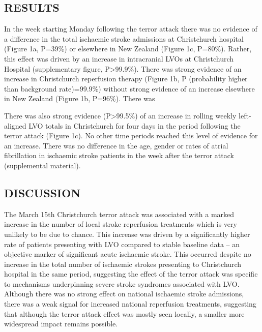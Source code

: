 \documentclass[
]{article}
\begin{document}
\hypertarget{results}{%
\subsection{RESULTS}\label{results}}

In the week starting Monday following the terror attack there was no
evidence of a difference in the total ischaemic stroke admissions at
Christchurch hospital (Figure 1a, P=39\%) or elsewhere in New Zealand
(Figure 1c, P=80\%). Rather, this effect was driven by an increase in
intracranial LVOs at Christchurch Hospital (supplementary figure,
P\textgreater99.9\%). There was strong evidence of an increase in
Christchurch reperfusion therapy (Figure 1b, P (probability higher than
background rate)=99.9\%) without strong evidence of an increase
elsewhere in New Zealand (Figure 1b, P=96\%). There was

There was also strong evidence (P\textgreater99.5\%) of an increase in
rolling weekly left-aligned LVO totals in Christchurch for four days in
the period following the terror attack (Figure 1c). No other time
periods reached this level of evidence for an increase. There was no
difference in the age, gender or rates of atrial fibrillation in
ischaemic stroke patients in the week after the terror attack
(supplemental material).

\hypertarget{discussion}{%
\subsection{DISCUSSION}\label{discussion}}

The March 15th Christchurch terror attack was associated with a marked
increase in the number of local stroke reperfusion treatments which is
very unlikely to be due to chance. This increase was driven by a
significantly higher rate of patients presenting with LVO compared to
stable baseline data -- an objective marker of significant acute
ischaemic stroke. This occurred despite no increase in the total number
of ischaemic strokes presenting to Christchurch hospital in the same
period, suggesting the effect of the terror attack was specific to
mechanisms underpinning severe stroke syndromes associated with LVO.
Although there was no strong effect on national ischaemic stroke
admissions, there was a weak signal for increased national reperfusion
treatments, suggesting that although the terror attack effect was mostly
seen locally, a smaller more widespread impact remains possible.
\end{document}

